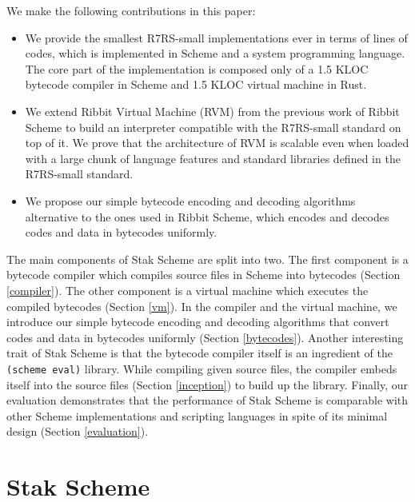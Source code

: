 \documentclass[sigplan, anonymous, review]{acmart}
\begin{document}
We make the following contributions in this paper:

\begin{itemize}
  \item We provide the smallest R7RS-small implementations ever in
    terms of lines of codes, which is implemented
    in Scheme and a system programming language.
    The core part of the implementation is composed only of a 1.5 KLOC bytecode
    compiler in Scheme and 1.5 KLOC virtual machine in Rust.
  \item We extend Ribbit Virtual Machine (RVM) from the previous
    work of Ribbit Scheme to build an interpreter compatible with the
    R7RS-small standard on top of it.
    We prove that the architecture of RVM is scalable even when
    loaded with a large chunk of language features and standard
    libraries defined in the R7RS-small standard.
  \item We propose our simple bytecode encoding and decoding algorithms
    alternative to the ones used in Ribbit Scheme, which encodes and
    decodes codes and data in bytecodes uniformly.
\end{itemize}

The main components of Stak Scheme are split into two.
The first component is a bytecode compiler which compiles source files in Scheme
into bytecodes (Section \ref{compiler}).
The other component is a virtual machine which executes the compiled
bytecodes (Section \ref{vm}).
In the compiler and the virtual machine, we introduce our simple
bytecode encoding and
decoding algorithms that convert codes and data in bytecodes
uniformly (Section \ref{bytecodes}).
Another interesting trait of Stak Scheme is that the bytecode compiler itself
is an ingredient of the \texttt{(scheme eval)} library.
While compiling given source files, the compiler embeds itself
into the source files (Section \ref{inception}) to build up the library.
Finally, our evaluation demonstrates that the performance of Stak Scheme is
comparable with other Scheme implementations and scripting
languages in spite of its minimal design (Section \ref{evaluation}).

\section{Stak Scheme}
\end{document}
